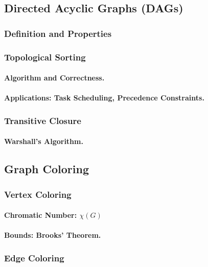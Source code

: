 \subsection{Directed Acyclic Graphs (DAGs)}
\label{subsec:dags}

\subsubsection{Definition and Properties}
\subsubsection{Topological Sorting}
\paragraph{Algorithm and Correctness.}
\paragraph{Applications: Task Scheduling, Precedence Constraints.}

\subsubsection{Transitive Closure}
\paragraph{Warshall's Algorithm.}

\subsection{Graph Coloring}
\label{subsec:coloring}

\subsubsection{Vertex Coloring}
\paragraph{Chromatic Number: $\chi(G)$}
\paragraph{Bounds: Brooks' Theorem.}

\subsubsection{Edge Coloring}
